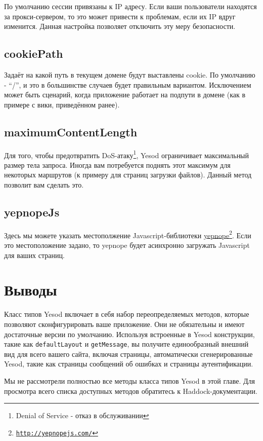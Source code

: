 По умолчанию сессии привязаны к IP адресу. Если ваши пользователи находятся за прокси-сервером, то это может привести к проблемам, если их IP вдруг изменится. Данная настройка позволяет отключить эту меру безопасности.

\subsection {cookiePath}

Задаёт на какой путь в текущем домене будут выставлены cookie. По умолчанию - ``/'', и это в большинстве случаев будет правильным вариантом. Исключением может быть сценарий, когда приложение работает на подпути в домене (как в примере с вики, приведённом ранее).

\subsection {maximumContentLength}

Для того, чтобы предотвратить DoS-атаку\footnote{Denial of Service - отказ в обслуживании}, Yesod ограничивает максимальный размер тела запроса.  Иногда вам потребуется поднять этот максимум для некоторых маршрутов (к примеру для страниц загрузки файлов). Данный метод позволит вам сделать это.

\subsection {yepnopeJs}

Здесь мы можете указать местополжение Javascript-библиотеки \href{http://yepnopejs.com/}{yepnope}\footnote{\href{http://yepnopejs.com/}{\texttt{http://yepnopejs.com/}}}. Если это местоположение задано, то yepnope будет асинхронно загружать Javascript для ваших страниц.

\section {Выводы}

Класс типов Yesod включает в себя набор переопределяемых методов, которые позволяют сконфигурировать ваше приложение. Они не обязательны и имеют достаточные версии по умолчанию. Используя встроенные в Yesod конструкции, такие как \lstinline!defaultLayout! и \lstinline!getMessage!, вы получите единообразный внешний вид для всего вашего сайта, включая страницы, автоматически сгенерированные Yesod, такие как страницы сообщений об ошибках и страницы аутентификации.

Мы не рассмотрели полностью все методы класса типов Yesod в этой главе. Для просмотра всего списка доступных методов обратитесь к Haddock-документации.
